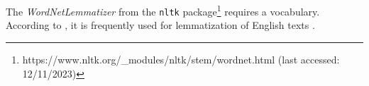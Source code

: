The \textit{WordNetLemmatizer} from the \texttt{nltk} package\footnote{https://www.nltk.org/\_modules/nltk/stem/wordnet.html (last accessed: 12/11/2023)} requires a vocabulary. %
According to \citeauthor{clusteringDocs2020}, it is frequently used for lemmatization of English texts \cite{clusteringDocs2020}.



